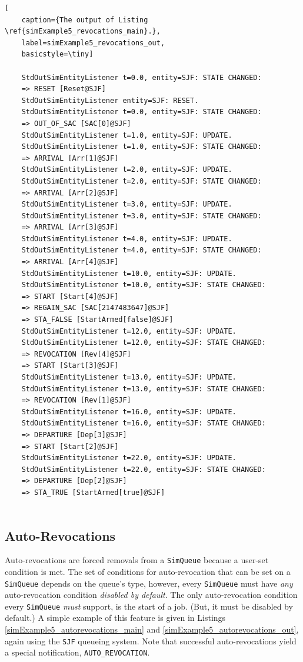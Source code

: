 \begin{lstfloat}
	\begin{lstlisting}[
	caption={The output of Listing \ref{simExample5_revocations_main}.},
	label=simExample5_revocations_out,
	basicstyle=\tiny]
	
	StdOutSimEntityListener t=0.0, entity=SJF: STATE CHANGED:
	=> RESET [Reset@SJF]
	StdOutSimEntityListener entity=SJF: RESET.
	StdOutSimEntityListener t=0.0, entity=SJF: STATE CHANGED:
	=> OUT_OF_SAC [SAC[0]@SJF]
	StdOutSimEntityListener t=1.0, entity=SJF: UPDATE.
	StdOutSimEntityListener t=1.0, entity=SJF: STATE CHANGED:
	=> ARRIVAL [Arr[1]@SJF]
	StdOutSimEntityListener t=2.0, entity=SJF: UPDATE.
	StdOutSimEntityListener t=2.0, entity=SJF: STATE CHANGED:
	=> ARRIVAL [Arr[2]@SJF]
	StdOutSimEntityListener t=3.0, entity=SJF: UPDATE.
	StdOutSimEntityListener t=3.0, entity=SJF: STATE CHANGED:
	=> ARRIVAL [Arr[3]@SJF]
	StdOutSimEntityListener t=4.0, entity=SJF: UPDATE.
	StdOutSimEntityListener t=4.0, entity=SJF: STATE CHANGED:
	=> ARRIVAL [Arr[4]@SJF]
	StdOutSimEntityListener t=10.0, entity=SJF: UPDATE.
	StdOutSimEntityListener t=10.0, entity=SJF: STATE CHANGED:
	=> START [Start[4]@SJF]
	=> REGAIN_SAC [SAC[2147483647]@SJF]
	=> STA_FALSE [StartArmed[false]@SJF]
	StdOutSimEntityListener t=12.0, entity=SJF: UPDATE.
	StdOutSimEntityListener t=12.0, entity=SJF: STATE CHANGED:
	=> REVOCATION [Rev[4]@SJF]
	=> START [Start[3]@SJF]
	StdOutSimEntityListener t=13.0, entity=SJF: UPDATE.
	StdOutSimEntityListener t=13.0, entity=SJF: STATE CHANGED:
	=> REVOCATION [Rev[1]@SJF]
	StdOutSimEntityListener t=16.0, entity=SJF: UPDATE.
	StdOutSimEntityListener t=16.0, entity=SJF: STATE CHANGED:
	=> DEPARTURE [Dep[3]@SJF]
	=> START [Start[2]@SJF]
	StdOutSimEntityListener t=22.0, entity=SJF: UPDATE.
	StdOutSimEntityListener t=22.0, entity=SJF: STATE CHANGED:
	=> DEPARTURE [Dep[2]@SJF]
	=> STA_TRUE [StartArmed[true]@SJF]
	
	\end{lstlisting}
\end{lstfloat}

\subsection{Auto-Revocations}

Auto-revocations are forced removals from a \lstinline|SimQueue|
because a user-set condition is met.
The set of conditions for auto-revocation
that can be set on a \lstinline|SimQueue|
depends on the queue's type,
however,
every \lstinline|SimQueue|
must have {\em any\/}
auto-revocation condition
{\em disabled by default}.
The only auto-revocation condition
every \lstinline|SimQueue| {\em must\/}
support, is the start of a job.
(But, it must be disabled by default.)
A simple example of this feature is given
in Listings \ref{simExample5_autorevocations_main}
and \ref{simExample5_autorevocations_out},
again using the \lstinline|SJF|
queueing system.
Note that successful auto-revocations
yield a special notification,
\lstinline|AUTO_REVOCATION|.

